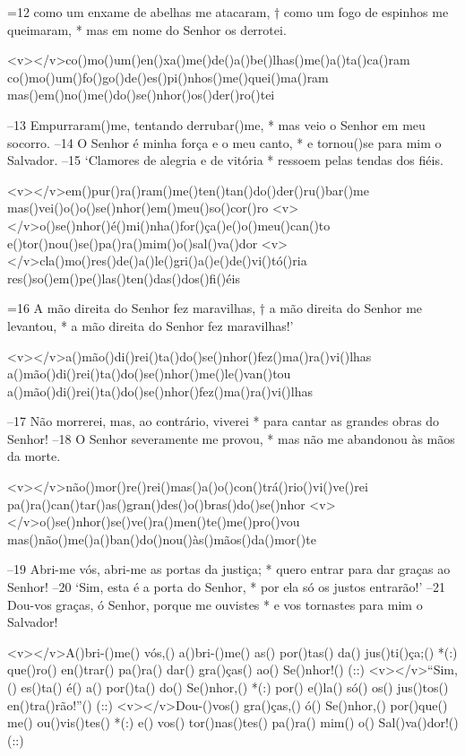 =12 como um enxame de abelhas me atacaram, †
como um fogo de espinhos me queimaram, *
mas em nome do Senhor os derrotei.

<v></v>co()mo()um()en()xa()me()de()a()be()lhas()me()a()ta()ca()ram
co()mo()um()fo()go()de()es()pi()nhos()me()quei()ma()ram
mas()em()no()me()do()se()nhor()os()der()ro()tei

–13 Empurraram()me, tentando derrubar()me, *
mas veio o Senhor em meu socorro.
–14 O Senhor é minha força e o meu canto, *
e tornou()se para mim o Salvador.
–15 ‘Clamores de alegria e de vitória *
ressoem pelas tendas dos fiéis.

<v></v>em()pur()ra()ram()me()ten()tan()do()der()ru()bar()me
mas()vei()o()o()se()nhor()em()meu()so()cor()ro
<v></v>o()se()nhor()é()mi()nha()for()ça()e()o()meu()can()to
e()tor()nou()se()pa()ra()mim()o()sal()va()dor
<v></v>cla()mo()res()de()a()le()gri()a()e()de()vi()tó()ria
res()so()em()pe()las()ten()das()dos()fi()éis

=16 A mão direita do Senhor fez maravilhas, †
a mão direita do Senhor me levantou, *
a mão direita do Senhor fez maravilhas!’

<v></v>a()mão()di()rei()ta()do()se()nhor()fez()ma()ra()vi()lhas
a()mão()di()rei()ta()do()se()nhor()me()le()van()tou
a()mão()di()rei()ta()do()se()nhor()fez()ma()ra()vi()lhas

–17 Não morrerei, mas, ao contrário, viverei *
para cantar as grandes obras do Senhor!
–18 O Senhor severamente me provou, *
mas não me abandonou às mãos da morte.

<v></v>não()mor()re()rei()mas()a()o()con()trá()rio()vi()ve()rei
pa()ra()can()tar()as()gran()des()o()bras()do()se()nhor
<v></v>o()se()nhor()se()ve()ra()men()te()me()pro()vou
mas()não()me()a()ban()do()nou()às()mãos()da()mor()te

–19 Abri-me vós, abri-me as portas da justiça; *
quero entrar para dar graças ao Senhor!
–20 ‘Sim, esta é a porta do Senhor, *
por ela só os justos entrarão!’
–21 Dou-vos graças, ó Senhor, porque me ouvistes *
e vos tornastes para mim o Salvador!

<v></v>A()bri-()me() vós,() a()bri-()me() as() por()tas() da() jus()ti()ça;() *(:)
que()ro() en()trar() pa()ra() dar() gra()ças() ao() Se()nhor!() (::)
<v></v>``Sim,() es()ta() é() a() por()ta() do() Se()nhor,() *(:)
por() e()la() só() os() jus()tos() en()tra()rão!''() (::)
<v></v>Dou-()vos() gra()ças,() ó() Se()nhor,() por()que() me() ou()vis()tes() *(:)
e() vos() tor()nas()tes() pa()ra() mim() o() Sal()va()dor!() (::)

